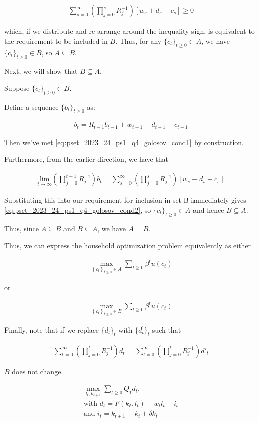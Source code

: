 \begin{align}
    \sum_{s=0}^{\infty}\left(\prod_{j=0}^s R_j^{-1}\right)\left[w_s+d_s-c_s\right] \geq 0
\end{align}

which, if we distribute and re-arrange around the inequality sign, is equivalent to the 
requirement to be included in $B$. Thus, for any $\{c_t\}_{t \geq 0} \in A$, we have $\{c_t\}_{t \geq 0} \in B$, so $A \subseteq B$.

Next, we will show that $B \subseteq A$.

Suppose $\{c_t\}_{t \geq 0} \in B$. 

Define a sequence $\{b_t\}_{t \geq 0}$ as:

\begin{align}
    b_t = R_{t-1}b_{t-1} + w_{t-1} + d_{t-1} - c_{t-1}
\end{align}

Then we've met \eqref{eq:pset_2023_24_ps1_q4_golosov_cond1} by construction.

Furthermore, from the earlier direction, we have that 

\begin{align}
    \underset{t \rightarrow \infty}{\text{lim}} (\prod_{j=0}^{t-1} R_j^{-1})b_t = \sum_{s =0}^{\infty}( \prod_{j=0}^s R_j^{-1})[w_s + d_s - c_s]
\end{align}

Substituting this into our requirement for inclusion in set B immediately 
gives \eqref{eq:pset_2023_24_ps1_q4_golosov_cond2}, so $\{c_t\}_{t \geq 0} \in A$
and hence $B \subseteq A$.

Thus, since $A \subseteq B$ and $B \subseteq A$, we have $A = B$.

Thus, we can express the household optimization problem equivalently as
either 

\begin{align}
    \max_{\left\{c_t\right\}_{t \geq 0} \in A} \sum_{t \geq 0} \beta^t u\left(c_t\right)
\end{align}

or 

\begin{align}
    \max_{\left\{c_t\right\}_{t \geq 0} \in B} \sum_{t \geq 0} \beta^t u\left(c_t\right)
\end{align}

Finally, note that 
if we replace $\{d_t\}_t$ with $\{d_t^{\prime}\}_t$ such that 

\begin{align}
    \sum_{t=0}^{\infty}\left(\prod_{j=0}^t R_j^{-1}\right) d_t=\sum_{t=0}^{\infty}\left(\prod_{j=0}^t R_j^{-1}\right) d'_t
\end{align}

$B$ does not change.


\begin{align}
    \max_{l_t,k_{t+1}} \sum_{t \geq 0} Q_td_t, \\
    \text{with } d_t = F(k_t, l_t) - w_tl_t - i_t \\
    \text{and } i_t = k_{t+1} - k_t + \delta k_t
\end{align}

